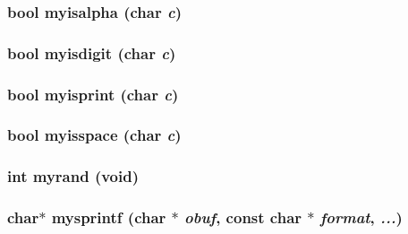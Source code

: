 \subsubsection[{myisalpha}]{\setlength{\rightskip}{0pt plus 5cm}bool myisalpha (char {\em c})}\label{misc_8h_8d9098815ece0c95b70d2d208d987d90}


\subsubsection[{myisdigit}]{\setlength{\rightskip}{0pt plus 5cm}bool myisdigit (char {\em c})}\label{misc_8h_94fabc202b35b98525e3d0e9c71af0b6}


\subsubsection[{myisprint}]{\setlength{\rightskip}{0pt plus 5cm}bool myisprint (char {\em c})}\label{misc_8h_0587a3c576dceed8a75e6bf3e6b43a74}


\subsubsection[{myisspace}]{\setlength{\rightskip}{0pt plus 5cm}bool myisspace (char {\em c})}\label{misc_8h_3ee813d5c2fd0067bf0aa95c4be26add}


\subsubsection[{myrand}]{\setlength{\rightskip}{0pt plus 5cm}int myrand (void)}\label{misc_8h_371debed7f5b7d78252c57128b8d5e88}


\subsubsection[{mysprintf}]{\setlength{\rightskip}{0pt plus 5cm}char$\ast$ mysprintf (char $\ast$ {\em obuf}, \/  const char $\ast$ {\em format}, \/   {\em ...})}\label{misc_8h_0b20cf34e1f8fd6145a84939ebf83117}


